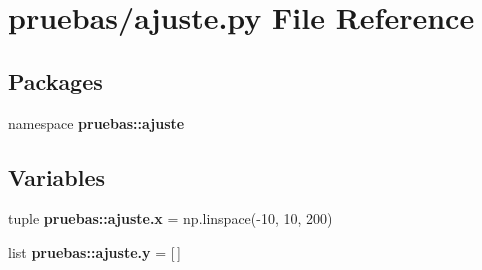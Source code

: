 \section{pruebas/ajuste.py \-File \-Reference}
\label{ajuste_8py}
\subsection*{\-Packages}
\begin{DoxyCompactItemize}
\item 
namespace {\bf pruebas\-::ajuste}
\end{DoxyCompactItemize}
\subsection*{\-Variables}
\begin{DoxyCompactItemize}
\item 
tuple {\bf pruebas\-::ajuste.\-x} = np.\-linspace(-\/10, 10, 200)
\item 
list {\bf pruebas\-::ajuste.\-y} = [$\,$]
\end{DoxyCompactItemize}
